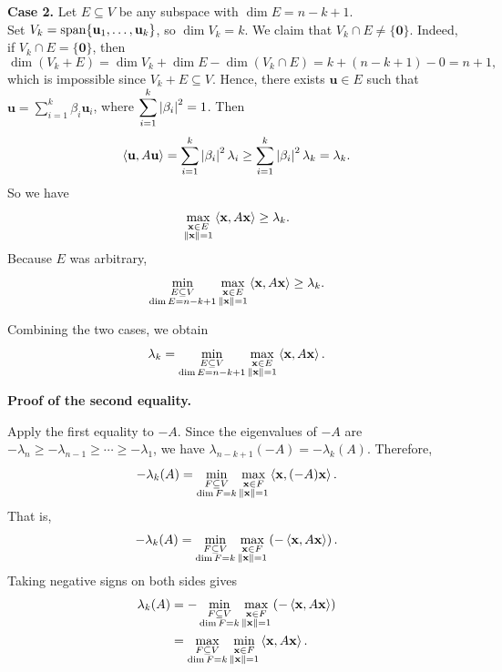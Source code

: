 \begin{pfbox}
\textbf{Case 2.}  
Let $E\subseteq V$ be any subspace with $\dim E=n-k+1$.\\
Set $V_k=\operatorname{span}\{\mathbf{u}_1,\ldots,\mathbf{u}_k\}$, so $\dim V_k=k$.
We claim that $V_k\cap E\neq \{\mathbf{0}\}$. 
Indeed, if $V_k\cap E=\{\mathbf{0}\}$, then
\[
    \dim(V_k+E)
    =
    \dim V_k+\dim E-\dim(V_k\cap E)
    =
    k+(n-k+1)-0
    =
    n+1,
\]
which is impossible since $V_k+E\subseteq V$. Hence, there exists $\mathbf{u}\in E$ such that $\mathbf{u}=\displaystyle\sum_{i=1}^k \beta_i\mathbf{u}_i$, where
$\displaystyle\sum_{i=1}^k\left\lvert \beta_i \right\rvert^2=1$. Then
\[
    \left\langle \mathbf{u}, A\mathbf{u} \right\rangle
    =
    \sum_{i=1}^k \left\lvert \beta_i \right\rvert^2\lambda_i
    \ge
    \sum_{i=1}^k \left\lvert \beta_i \right\rvert^2\lambda_k
    =
    \lambda_k.
\]
So we have
\[
    \max_{\substack{\mathbf{x}\in E\\ \left\lVert \mathbf{x} \right\rVert=1}}
    \left\langle \mathbf{x}, A\mathbf{x} \right\rangle
    \ge
    \lambda_k.
\]
Because $E$ was arbitrary,
\[
    \min_{\substack{E\subseteq V\\ \dim E=n-k+1}}
    \max_{\substack{\mathbf{x}\in E\\ \left\lVert \mathbf{x} \right\rVert=1}}
    \left\langle \mathbf{x}, A\mathbf{x} \right\rangle
    \ge
    \lambda_k.
\]

Combining the two cases, we obtain
\[
    \lambda_k
    =
    \min_{\substack{E\subseteq V\\ \dim E=n-k+1}}
    \max_{\substack{\mathbf{x}\in E\\ \left\lVert \mathbf{x} \right\rVert=1}}
    \left\langle \mathbf{x}, A\mathbf{x} \right\rangle.
\]

\medskip

\textbf{Proof of the second equality.}

Apply the first equality to $-A$. Since the eigenvalues of $-A$ are
$-\lambda_n\ge -\lambda_{n-1}\ge \cdots \ge -\lambda_1$, we have
$\lambda_{n-k+1}(-A)=-\lambda_k(A)$. Therefore,
\[
    -\lambda_k(A)
    =
    \min_{\substack{F\subseteq V\\ \dim F=k}}
    \max_{\substack{\mathbf{x}\in F\\ \left\lVert \mathbf{x} \right\rVert=1}}
    \left\langle \mathbf{x}, (-A)\mathbf{x} \right\rangle.
\]
That is,
\[
    -\lambda_k(A)
    =
    \min_{\substack{F\subseteq V\\ \dim F=k}}
    \max_{\substack{\mathbf{x}\in F\\ \left\lVert \mathbf{x} \right\rVert=1}}
    \left( -\left\langle \mathbf{x}, A\mathbf{x} \right\rangle \right).
\]
Taking negative signs on both sides gives
\begin{align*}
    \lambda_k(A)
    &=
    -\min_{\substack{F\subseteq V\\ \dim F=k}}
    \max_{\substack{\mathbf{x}\in F\\ \left\lVert \mathbf{x} \right\rVert=1}}
    \left( -\left\langle \mathbf{x}, A\mathbf{x} \right\rangle \right)                         \\
    &=
    \max_{\substack{F\subseteq V\\ \dim F=k}}
    \min_{\substack{\mathbf{x}\in F\\ \left\lVert \mathbf{x} \right\rVert=1}}
    \left\langle \mathbf{x}, A\mathbf{x} \right\rangle.
\end{align*}
\end{pfbox}

